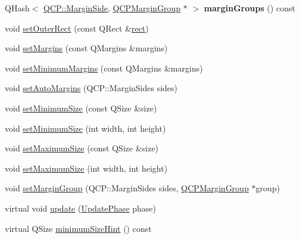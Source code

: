 \begin{DoxyCompactItemize}
\item 
\mbox{\label{class_q_c_p_layout_element_ac8d1139a81a1625860647e307ae2b733}} 
Q\+Hash$<$ \mbox{\hyperlink{namespace_q_c_p_a7e487e3e2ccb62ab7771065bab7cae54}{Q\+C\+P\+::\+Margin\+Side}}, \mbox{\hyperlink{class_q_c_p_margin_group}{Q\+C\+P\+Margin\+Group}} $\ast$ $>$ {\bfseries margin\+Groups} () const
\item 
void \mbox{\hyperlink{class_q_c_p_layout_element_a38975ea13e36de8e53391ce41d94bc0f}{set\+Outer\+Rect}} (const Q\+Rect \&\mbox{\hyperlink{class_q_c_p_layout_element_a208effccfe2cca4a0eaf9393e60f2dd4}{rect}})
\item 
void \mbox{\hyperlink{class_q_c_p_layout_element_a8f450b1f3f992ad576fce2c63d8b79cf}{set\+Margins}} (const Q\+Margins \&margins)
\item 
void \mbox{\hyperlink{class_q_c_p_layout_element_a0a8a17abc16b7923159fcc7608f94673}{set\+Minimum\+Margins}} (const Q\+Margins \&margins)
\item 
void \mbox{\hyperlink{class_q_c_p_layout_element_accfda49994e3e6d51ed14504abf9d27d}{set\+Auto\+Margins}} (Q\+C\+P\+::\+Margin\+Sides sides)
\item 
void \mbox{\hyperlink{class_q_c_p_layout_element_a5dd29a3c8bc88440c97c06b67be7886b}{set\+Minimum\+Size}} (const Q\+Size \&size)
\item 
void \mbox{\hyperlink{class_q_c_p_layout_element_a8e0447614a0bf92de9a7304588c6b96e}{set\+Minimum\+Size}} (int width, int height)
\item 
void \mbox{\hyperlink{class_q_c_p_layout_element_a74eb5280a737ab44833d506db65efd95}{set\+Maximum\+Size}} (const Q\+Size \&size)
\item 
void \mbox{\hyperlink{class_q_c_p_layout_element_a03e0e9c48f230217c529b0819f832d84}{set\+Maximum\+Size}} (int width, int height)
\item 
void \mbox{\hyperlink{class_q_c_p_layout_element_a516e56f76b6bc100e8e71d329866847d}{set\+Margin\+Group}} (Q\+C\+P\+::\+Margin\+Sides sides, \mbox{\hyperlink{class_q_c_p_margin_group}{Q\+C\+P\+Margin\+Group}} $\ast$group)
\item 
virtual void \mbox{\hyperlink{class_q_c_p_layout_element_a929c2ec62e0e0e1d8418eaa802e2af9b}{update}} (\mbox{\hyperlink{class_q_c_p_layout_element_a0d83360e05735735aaf6d7983c56374d}{Update\+Phase}} phase)
\item 
virtual Q\+Size \mbox{\hyperlink{class_q_c_p_layout_element_ab3fdb5c9a5189bb2dac10d4d25329cd8}{minimum\+Size\+Hint}} () const

\end{DoxyCompactItemize}
